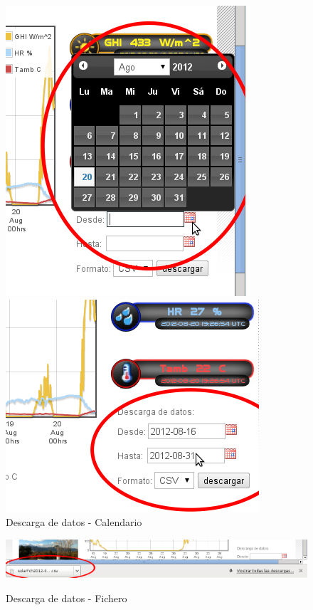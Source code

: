 \begin{figure}[ht]
	\begin{minipage}[b]{0.47\linewidth}
        	\centering
        	\includegraphics[scale=0.5]{./images/cap5chap1img2-1}
	\end{minipage}
	\begin{minipage}[b]{0.47\linewidth}
	 	\centering
        	\includegraphics[scale=0.5]{./images/cap5chap1img2-2}
	\end{minipage}
	\caption{Descarga de datos - Calendario}
	\label{calendario}
\end{figure}

\begin{figure}[ht]
	\centering
        \includegraphics[scale=0.45]{./images/cap5chap1img2-3}
        \label{descargafichero}
	\caption{Descarga de datos - Fichero}
\end{figure}

